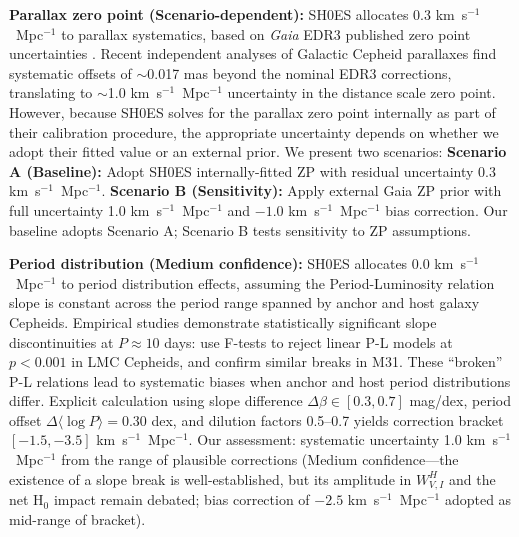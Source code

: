 \documentclass[preprint, linenumbers]{aastex701}
\begin{document}
\textbf{Parallax zero point (Scenario-dependent):} SH0ES allocates 0.3 km~s$^{-1}$~Mpc$^{-1}$ to parallax systematics, based on \textit{Gaia} EDR3 published zero point uncertainties \citep{Lindegren2021}. Recent independent analyses of Galactic Cepheid parallaxes find systematic offsets of $\sim$0.017 mas beyond the nominal EDR3 corrections, translating to $\sim$1.0 km~s$^{-1}$~Mpc$^{-1}$ uncertainty in the distance scale zero point. However, because SH0ES solves for the parallax zero point internally as part of their calibration procedure, the appropriate uncertainty depends on whether we adopt their fitted value or an external prior. We present two scenarios: \textbf{Scenario A (Baseline):} Adopt SH0ES internally-fitted ZP with residual uncertainty 0.3 km~s$^{-1}$~Mpc$^{-1}$. \textbf{Scenario B (Sensitivity):} Apply external Gaia ZP prior with full uncertainty 1.0 km~s$^{-1}$~Mpc$^{-1}$ and $-1.0$ km~s$^{-1}$~Mpc$^{-1}$ bias correction. Our baseline adopts Scenario A; Scenario B tests sensitivity to ZP assumptions.

\textbf{Period distribution (Medium confidence):} SH0ES allocates 0.0 km~s$^{-1}$~Mpc$^{-1}$ to period distribution effects, assuming the Period-Luminosity relation slope is constant across the period range spanned by anchor and host galaxy Cepheids. Empirical studies demonstrate statistically significant slope discontinuities at $P \approx 10$ days: \citet{Ngeow2006} use F-tests to reject linear P-L models at $p < 0.001$ in LMC Cepheids, and \citet{Kodric2015} confirm similar breaks in M31. These ``broken'' P-L relations lead to systematic biases when anchor and host period distributions differ. Explicit calculation using slope difference $\Delta\beta \in [0.3, 0.7]$ mag/dex, period offset $\Delta\langle \log P \rangle = 0.30$ dex, and dilution factors 0.5--0.7 yields correction bracket $[-1.5, -3.5]$ km~s$^{-1}$~Mpc$^{-1}$. Our assessment: systematic uncertainty 1.0 km~s$^{-1}$~Mpc$^{-1}$ from the range of plausible corrections (Medium confidence---the existence of a slope break is well-established, but its amplitude in $W^H_{V,I}$ and the net H$_0$ impact remain debated; bias correction of $-2.5$ km~s$^{-1}$~Mpc$^{-1}$ adopted as mid-range of bracket).
\end{document}
